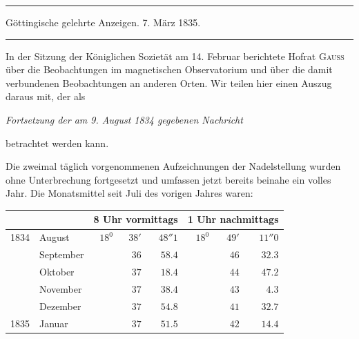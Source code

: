 \begin{samepage}
\bigskip
{}
\begin{center}
\hrule\vspace{2mm}
Göttingische gelehrte Anzeigen. 7. März 1835.
\vspace{2mm}\hrule\vspace{5mm}
\end{center}
In der Sitzung der Königlichen Sozietät am 14. Februar berichtete Hofrat \textsc{Gauss} über die Beobachtungen im magnetischen Observatorium und über die damit verbundenen Beobachtungen an anderen Orten. Wir teilen hier einen Auszug daraus mit, der als
\begin{center}\itshape Fortsetzung der am 9. August 1834 gegebenen Nachricht\end{center}
\noindent betrachtet werden kann.
\end{samepage}

Die zweimal täglich vorgenommenen Aufzeichnungen der Nadelstellung wurden ohne Unterbrechung fortgesetzt und umfassen jetzt bereits beinahe ein volles Jahr. Die Monatsmittel seit Juli des vorigen Jahres waren:
\begin{center}
\begin{tabular}{rl|rrr|rrr}
 & & \multicolumn{3}{c|}{8 Uhr vormittags} & \multicolumn{3}{c}{1 Uhr nachmittags}\\\hline
1834 & August & $18^0$ & $38'$ & $48''1$ & $18^0$ & $49'$ & $11''0$\\
 & September & & $36$ & $58.4$ & & $46$ & $32.3$\\
 & Oktober & & $37$ & $18.4$ & & $44$ & $47.2$\\
 & November & & $37$ & $38.4$ & & $43$ & $4.3$\\
 & Dezember & & $37$ & $54.8$ & & $41$ & $32.7$\\
1835 & Januar & & $37$ & $51.5$ & & $42$ & $14.4$
\end{tabular}
\end{center}

